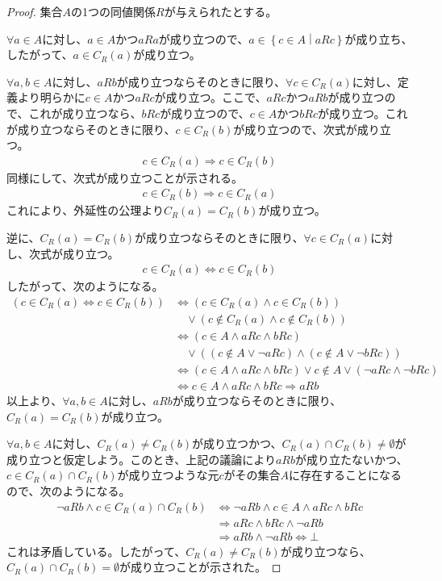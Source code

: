 \documentclass[dvipdfmx]{jsarticle}
\begin{document}
\begin{proof}
集合$A$の1つの同値関係$R$が与えられたとする。\par
$\forall a \in A$に対し、$a \in A$かつ$aRa$が成り立つので、$a \in \left\{ c \in A \middle| aRc \right\}$が成り立ち、したがって、$a \in C_{R}(a)$が成り立つ。\par
$\forall a,b \in A$に対し、$aRb$が成り立つならそのときに限り、$\forall c \in C_{R}(a)$に対し、定義より明らかに$c \in A$かつ$aRc$が成り立つ。ここで、$aRc$かつ$aRb$が成り立つので、これが成り立つなら、$bRc$が成り立つので、$c \in A$かつ$bRc$が成り立つ。これが成り立つならそのときに限り、$c \in C_{R}(b)$が成り立つので、次式が成り立つ。
\begin{align*}
c \in C_{R}(a) \Rightarrow c \in C_{R}(b)
\end{align*}
同様にして、次式が成り立つことが示される。
\begin{align*}
c \in C_{R}(b) \Rightarrow c \in C_{R}(a)
\end{align*}
これにより、外延性の公理より$C_{R}(a) = C_{R}(b)$が成り立つ。\par
逆に、$C_{R}(a) = C_{R}(b)$が成り立つならそのときに限り、$\forall c \in C_{R}(a)$に対し、次式が成り立つ。
\begin{align*}
c \in C_{R}(a) \Leftrightarrow c \in C_{R}(b)
\end{align*}
したがって、次のようになる。
\begin{align*}
\left( c \in C_{R}(a) \Leftrightarrow c \in C_{R}(b) \right) &\Leftrightarrow \left( c \in C_{R}(a) \land c \in C_{R}(b) \right) \\
&\quad \vee \left( c \notin C_{R}(a) \land c \notin C_{R}(b) \right)\\
&\Leftrightarrow (c \in A \land aRc \land bRc) \\
&\quad \vee \left( (c \notin A \vee \neg aRc) \land (c \notin A \vee \neg bRc) \right)\\
&\Leftrightarrow (c \in A \land aRc \land bRc) \vee c \notin A \vee (\neg aRc \land \neg bRc)\\
&\Leftrightarrow c \in A \land aRc \land bRc \Rightarrow aRb
\end{align*}
以上より、$\forall a,b \in A$に対し、$aRb$が成り立つならそのときに限り、$C_{R}(a) = C_{R}(b)$が成り立つ。\par
$\forall a,b \in A$に対し、$C_{R}(a) \neq C_{R}(b)$が成り立つかつ、$C_{R}(a) \cap C_{R}(b) \neq \emptyset$が成り立つと仮定しよう。このとき、上記の議論により$aRb$が成り立たないかつ、$c \in C_{R}(a) \cap C_{R}(b)$が成り立つような元$c$がその集合$A$に存在することになるので、次のようになる。
\begin{align*}
\neg aRb \land c \in C_{R}(a) \cap C_{R}(b) &\Leftrightarrow \neg aRb \land c \in A \land aRc \land bRc\\
&\Rightarrow aRc \land bRc \land \neg aRb\\
&\Rightarrow aRb \land \neg aRb \Leftrightarrow \bot
\end{align*}
これは矛盾している。したがって、$C_{R}(a) \neq C_{R}(b)$が成り立つなら、$C_{R}(a) \cap C_{R}(b) = \emptyset$が成り立つことが示された。
\end{proof}
\end{document}
